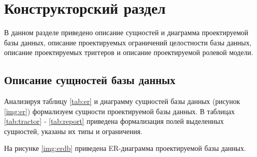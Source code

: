 \chapter{Конструкторский раздел}

В данном разделе приведено описание сущностей и диаграмма проектируемой базы данных, описание проектируемых ограничений целостности базы данных, описание проектируемых триггеров и описание проектируемой ролевой модели.

\section{Описание сущностей базы данных}

Анализируя таблицу \ref{tab:er} и диаграмму сущностей базы данных (рисунок \ref{img:er}) формализуем сущности проектируемой базы данных. В таблицах \ref{tab:tractor} - \ref{tab:report} приведена формализация полей выделенных сущностей, указаны их типы и ограничения.



На рисунке \ref{img:erdb} приведена ER-диаграмма проектируемой базы данных.


